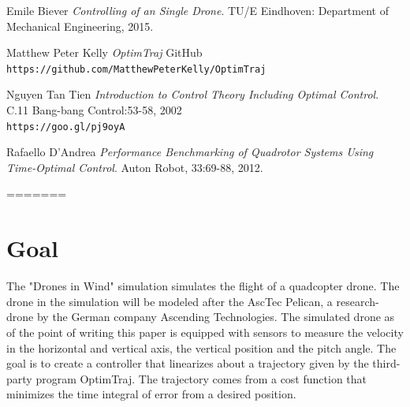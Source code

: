 \documentclass[12pt]{article}
\begin{document}
	\begin{thebibliography}{9}
		
		
		Emile Biever
		\textit{Controlling of an Single Drone}.
		TU/E Eindhoven: Department of Mechanical Engineering, 2015.
		
		
		
		Matthew Peter Kelly
		\textit{OptimTraj}
		GitHub
		\\\texttt{https://github.com/MatthewPeterKelly/OptimTraj}
		
		
		Nguyen Tan Tien
		\textit{Introduction to Control Theory Including Optimal Control}.
		C.11 Bang-bang Control:53-58, 2002
		\\\texttt{https://goo.gl/pj9oyA}
		
		
		
		Rafaello D'Andrea
		\textit{Performance Benchmarking of Quadrotor Systems Using Time-Optimal Control}.
		Auton Robot, 33:69-88, 2012.
		
		
		
		
		
		
		
		
		
		
		
		
		
		
		
	\end{thebibliography}
	
	
=======

\maketitle


\section{Goal}
The "Drones in Wind" simulation simulates the flight of a quadcopter drone. The drone in the simulation will be modeled after the AscTec Pelican, a research-drone by the German company Ascending Technologies. The simulated drone as of the point of writing this paper is equipped with sensors to measure the velocity in the horizontal and vertical axis, the vertical position and the pitch angle. The goal is to create a controller that linearizes about a trajectory given by the third-party program OptimTraj. The trajectory comes from a cost function that minimizes the time integral of error from a desired position.
\end{document}
